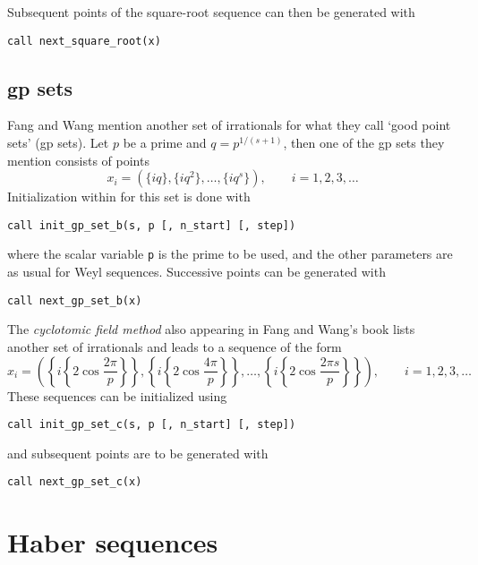 Subsequent points of the square-root sequence can then be generated with
\begin{lstlisting}
call next_square_root(x)
\end{lstlisting}

\subsection{gp sets}

Fang and Wang \cite{fang94wang} mention another set of irrationals for what
they call `good point sets' (gp sets).  Let $p$ be a prime and $q=p^{1/(s+1)}$,
then one of the gp sets they mention consists of points
\[
x_i = ( \{iq\}, \{iq^2\}, \dots, \{iq^s\} ), \qquad i=1,2,3,\dots
\]
Initialization within \qmcpack{} for this set is done with
\begin{lstlisting}
call init_gp_set_b(s, p [, n_start] [, step])
\end{lstlisting}
where the scalar variable \verb!p! is the prime to be used, and the other
parameters are as usual for Weyl sequences.  Successive points can be
generated with
\begin{lstlisting}
call next_gp_set_b(x)
\end{lstlisting}

The \emph{cyclotomic field method} also appearing in Fang and Wang's book
lists another set of irrationals and leads to a sequence of the form
\[
x_i = \left( \left\{i\left\{2\cos{\frac{2\pi}{p}}\right\}\right\}, \left\{i\left\{2\cos{\frac{4\pi}{p}}\right\}\right\}, \ldots, \left\{i\left\{2\cos{\frac{2\pi s}{p}}\right\}\right\} \right),
 \qquad i=1,2,3,\ldots
\]
These sequences can be initialized using
\begin{lstlisting}
call init_gp_set_c(s, p [, n_start] [, step])
\end{lstlisting}
and subsequent points are to be generated with
\begin{lstlisting}
call next_gp_set_c(x)
\end{lstlisting}

\section{Haber sequences}

